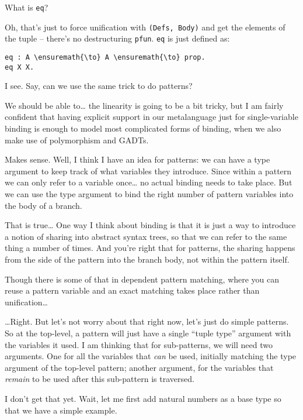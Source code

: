 \heroSTUDENT{} What is \texttt{eq}?

\heroADVISOR{} Oh, that's just to force unification with
\texttt{(Defs,\ Body)} and get the elements of the tuple -- there's no
destructuring \texttt{pfun}. \texttt{eq} is just defined as:

\begin{verbatim}
eq : A \ensuremath{\to} A \ensuremath{\to} prop.
eq X X.
\end{verbatim}

\heroSTUDENT{} I see. Say, can we use the same trick to do patterns?

\heroADVISOR{} We should be able to\ldots{} the linearity is going to be a bit
tricky, but I am fairly confident that having explicit support in our
metalanguage just for single-variable binding is enough to model most
complicated forms of binding, when we also make use of polymorphism and
GADTs.

\heroSTUDENT{} Makes sense. Well, I think I have an idea for patterns: we can
have a type argument to keep track of what variables they introduce.
Since within a pattern we can only refer to a variable once\ldots{} no
actual binding needs to take place. But we can use the type argument to
bind the right number of pattern variables into the body of a branch.

\heroADVISOR{} That is true\ldots{} One way I think about binding is that it
is just a way to introduce a notion of sharing into abstract syntax
trees, so that we can refer to the same thing a number of times. And
you're right that for patterns, the sharing happens from the side of the
pattern into the branch body, not within the pattern itself.

\heroSTUDENT{} Though there is some of that in dependent pattern matching,
where you can reuse a pattern variable and an exact matching takes place
rather than unification\ldots{}

\heroADVISOR{} \ldots{}Right. But let's not worry about that right now, let's
just do simple patterns. So at the top-level, a pattern will just have a
single ``tuple type'' argument with the variables it used. I am thinking
that for sub-patterns, we will need two arguments. One for all the
variables that \emph{can} be used, initially matching the type argument
of the top-level pattern; another argument, for the variables that
\emph{remain} to be used after this sub-pattern is traversed.

\heroSTUDENT{} I don't get that yet. Wait, let me first add natural numbers as
a base type so that we have a simple example.

